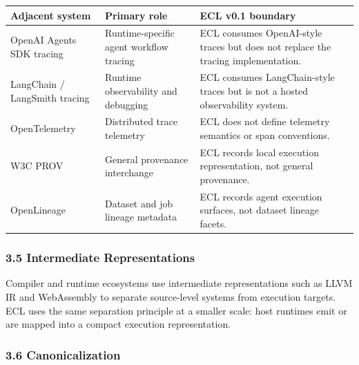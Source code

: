 \documentclass[
]{article}
\newcounter{none} %
\begin{document}
{\def\LTcaptype{none} %
\begin{longtable}[]{@{}
  >{\raggedright\arraybackslash}p{}
  >{\raggedright\arraybackslash}p{}
  >{\raggedright\arraybackslash}p{}@{}}
\toprule\noalign{}
\begin{minipage}[b]{\linewidth}\raggedright
Adjacent system
\end{minipage} & \begin{minipage}[b]{\linewidth}\raggedright
Primary role
\end{minipage} & \begin{minipage}[b]{\linewidth}\raggedright
ECL v0.1 boundary
\end{minipage} \\
\midrule\noalign{}
\endhead
\bottomrule\noalign{}
\endlastfoot
OpenAI Agents SDK tracing & Runtime-specific agent workflow tracing &
ECL consumes OpenAI-style traces but does not replace the tracing
implementation. \\
LangChain / LangSmith tracing & Runtime observability and debugging &
ECL consumes LangChain-style traces but is not a hosted observability
system. \\
OpenTelemetry & Distributed trace telemetry & ECL does not define
telemetry semantics or span conventions. \\
W3C PROV & General provenance interchange & ECL records local execution
representation, not general provenance. \\
OpenLineage & Dataset and job lineage metadata & ECL records agent
execution surfaces, not dataset lineage facets. \\
\end{longtable}
}

\subsubsection{3.5 Intermediate
Representations}\label{intermediate-representations}

Compiler and runtime ecosystems use intermediate representations such as
LLVM IR and WebAssembly to separate source-level systems from execution
targets. ECL uses the same separation principle at a smaller scale: host
runtimes emit or are mapped into a compact execution representation.

\subsubsection{3.6 Canonicalization}\label{canonicalization}
\end{document}
